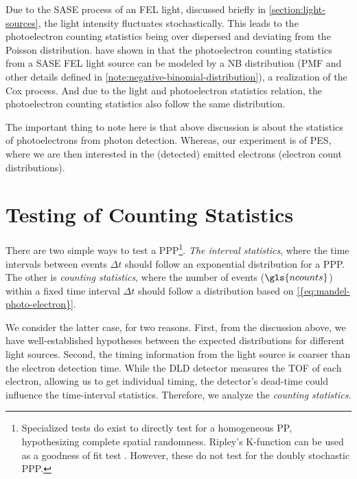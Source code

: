 Due to the \gls{SASE} process of an \gls{FEL} light, discussed briefly in \cref{section:light-sources}, the light intensity fluctuates stochastically. This leads to the photoelectron counting statistics being over dispersed and deviating from the Poisson distribution. \citeauthor{saldinStatisticalPropertiesRadiation1998} have shown in \cite{saldinStatisticalPropertiesRadiation1998} that the photoelectron counting statistics from a \gls{SASE} \gls{FEL} light source can be modeled by a \gls{NB} distribution (\gls{PMF} and other details defined in \cref{note:negative-binomial-distribution}), a realization of the Cox process. And due to the light and photoelectron statistics relation, the photoelectron counting statistics also follow the same distribution.

The important thing to note here is that above discussion is about the statistics of photoelectrons from photon detection. Whereas, our experiment is of \gls{PES}, where we are then interested in the (detected) emitted electrons (electron count distributions).

\section{Testing of Counting Statistics}
There are two simple ways to test a \gls{PPP}\footnote{Specialized tests do exist to directly test for a homogeneous \gls{PP}, hypothesizing complete spatial randomness. Ripley's K-function can be used as a goodness of fit test \cite[Section~2.6.4]{chiuStochasticGeometryIts2013}. However, these do not test for the doubly stochastic \gls{PPP}.}. \textit{The interval statistics}, where the time intervals between events $\Delta t$ should follow an exponential distribution for a \gls{PPP}. The other is \textit{counting statistics}, where the number of events ($\gls{ncounts}$) within a fixed time interval $\Delta t$ should follow a distribution based on \cref{{eq:mandel-photo-electron}}.

We consider the latter case, for two reasons. First, from the discussion above, we have well-established hypotheses between the expected distributions for different light sources. Second, the timing information from the light source is coarser than the electron detection time. While the \gls{DLD} detector measures the \gls{TOF} of each electron, allowing us to get individual timing, the detector's dead-time could influence the time-interval statistics. Therefore, we analyze the \textit{counting statistics}.

